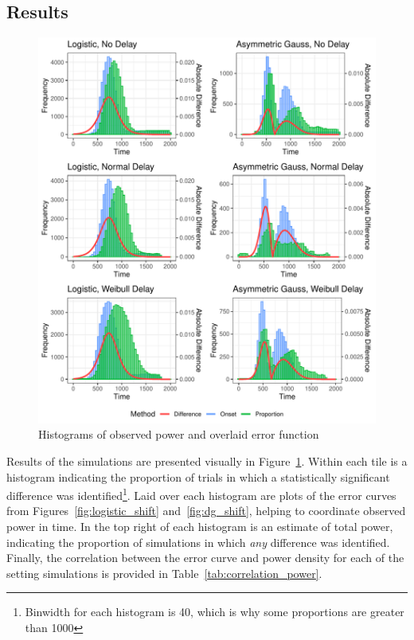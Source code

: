 \documentclass{article}
\begin{document}
\subsection{Results}

\begin{figure}[H]
\centering
\includegraphics{diff_hist_all.pdf}
\caption{Histograms of observed power and overlaid error function}
\label{fig:diff_hist_all}
\end{figure}


Results of the simulations are presented visually in Figure~\ref{fig:diff_hist_all}. Within each tile is a histogram indicating the proportion of trials in which a statistically significant difference was identified\footnote{Binwidth for each histogram is 40, which is why some proportions are greater than 1000}. Laid over each histogram are plots of the error curves from Figures~\ref{fig:logistic_shift} and~\ref{fig:dg_shift}, helping to coordinate observed power in time. In the top right of each histogram is an estimate of total power, indicating the proportion of simulations in which \textit{any} difference was identified. Finally, the correlation between the error curve and power density for each of the setting simulations is provided in Table~\ref{tab:correlation_power}.
\end{document}
